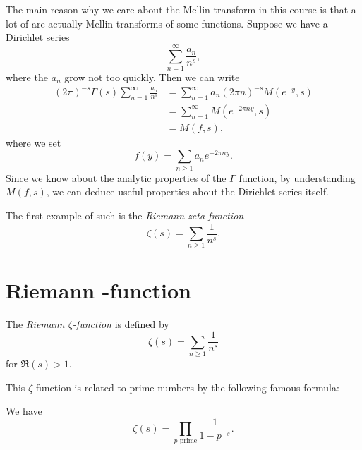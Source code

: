 \documentclass[a4paper]{article}
\begin{document}
The main reason why we care about the Mellin transform in this course is that a lot of  are actually Mellin transforms of some functions. Suppose we have a Dirichlet series
\[
  \sum_{n = 1}^\infty \frac{a_n}{n^s},
\]
where the $a_n$ grow not too quickly. Then we can write
\begin{align*}
  (2\pi)^{-s} \Gamma(s)\sum_{n = 1}^\infty \frac{a_n}{n^s} &= \sum_{n = 1}^\infty a_n (2\pi n)^{-s} M(e^{-y}, s)\\
  &= \sum_{n = 1}^\infty M(e^{-2 \pi n y}, s) \\
  &= M(f, s),
\end{align*}
where we set
\[
  f(y) = \sum_{n \geq 1} a_n e^{-2\pi n y}.
\]
Since we know about the analytic properties of the $\Gamma$ function, by understanding $M(f, s)$, we can deduce useful properties about the Dirichlet series itself.

The first example of such is the \emph{Riemann zeta function}
\[
  \zeta(s) = \sum_{n \geq 1} \frac{1}{n^s}.
\]

\section{Riemann -function}
\begin{defi}
  The \emph{Riemann $\zeta$-function} is defined by
  \[
    \zeta(s) = \sum_{n \geq 1} \frac{1}{n^s}
  \]
  for $\Re(s) > 1$.
\end{defi}

This $\zeta$-function is related to prime numbers by the following famous formula:
\begin{prop}
  We have
  \[
    \zeta(s) = \prod_{p \text{ prime}} \frac{1}{1 - p^{-s}}.
  \]
\end{prop}
\end{document}
